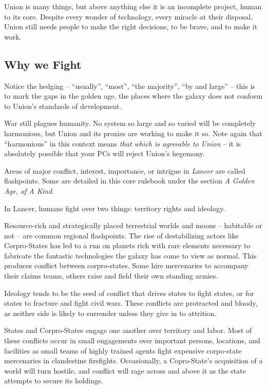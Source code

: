 Union is many things, but above anything else it is an incomplete project, human to its core.
Despite every wonder of technology, every miracle at their disposal, Union still needs people to
make the right decisions, to be brave, and to make it work.

\subsection{Why we Fight}

Notice the hedging -- “usually”, “most”, “the majority”, “by and large” -- this is to mark the gaps
in the golden age, the places where the galaxy does not conform to Union’s standards of
development.

War still plagues humanity. No system so large and so varied will be completely harmonious, but
Union and its proxies are working to make it so. Note again that “harmonious” in this context
means \textit{that which is agreeable to Union} -- it is absolutely possible that your PCs will reject
Union’s hegemony.

Areas of major conflict, interest, importance, or intrigue in \textit{Lancer} are called flashpoints. Some
are detailed in this core rulebook under the section \textit{A Golden Age, of A Kind}.

In Lancer, humans fight over two things: territory rights and ideology.

Resource-rich and strategically placed terrestrial worlds and moons -- habitable or not -- are
common regional flashpoints. The rise of destabilizing actors like Corpro-States has led to a run
on planets rich with rare elements necessary to fabricate the fantastic technologies the galaxy
has come to view as normal. This produces conflict between corpro-states. Some hire
mercenaries to accompany their claims teams, others raise and field their own standing armies.

Ideology tends to be the seed of conflict that drives states to fight states, or for states to fracture
and fight civil wars. These conflicts are protracted and bloody, as neither side is likely to
surrender unless they give in to attrition.

States and Corpro-States engage one another over territory and labor. Most of these conflicts
occur in small engagements over important persons, locations, and facilities as small teams of
highly trained agents fight expensive corpo-state mercenaries in clandestine firefights.
Occasionally, a Copro-State’s acquisition of a world will turn hostile, and conflict will rage across
and above it as the state attempts to secure its holdings.